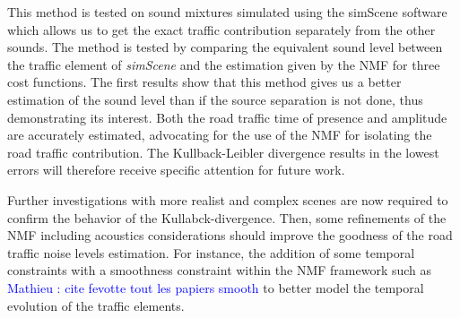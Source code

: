 \documentclass{article}
\newcommand{\ml}[1]{\textcolor{blue}{ Mathieu : #1}}
\begin{document}
\begin{sloppy}
This method is tested on sound mixtures simulated using the simScene software which allows us to get the exact traffic contribution separately from the other sounds. The method is tested by comparing the equivalent sound level between the traffic element of \textit{simScene} and the estimation given by the NMF for three cost functions. The first results show that this method gives us a better estimation of the sound level than if the source separation is not done, thus demonstrating its interest. Both the road traffic time of presence and amplitude are accurately estimated, advocating for the use of the NMF for isolating the road traffic contribution. The Kullback-Leibler divergence results in the lowest errors will therefore receive specific attention for future work. 

Further investigations with more realist and complex scenes are now required to confirm the behavior of the Kullabck-divergence. Then, some refinements of the NMF including acoustics considerations should improve the goodness of the road traffic noise levels estimation. For instance, the addition of some temporal constraints with a smoothness constraint within the NMF framework such as \ml{cite fevotte tout les papiers smooth} to better model the temporal evolution of the traffic elements.






\end{sloppy}
\end{document}

